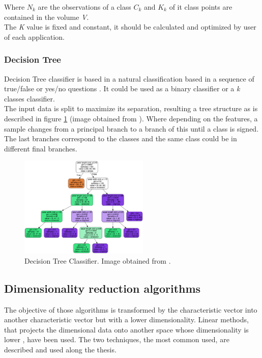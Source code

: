 Where $N_k$ are the observations of a class $C_k$ and $K_k$ of it class points are contained in the volume \textit{V}.\\

The \textit{K} value is fixed and constant, it should be calculated and optimized by user of each application.\\

\subsubsection{Decision Tree}
Decision Tree classifier is based in a natural classification based in a sequence of true/false or yes/no questions \cite{Duda}. It could be used as a binary classifier or a \textit{k} classes classifier. \\

The input data is split to maximize its separation, resulting a tree structure \cite{ClassifiersReview} as is described in figure \ref{fig:Tree} (image obtained from \cite{Treeimage}). Where depending on the features, a sample changes from a principal branch to a branch of this until a class is signed. The last branches correspond to the classes and the same class could be in different final branches. \\

\begin{figure}[htb]
\centering
\includegraphics[width=0.55\textwidth]{images_miscelaneus/tree.png}
\caption{Decision Tree Classifier. Image obtained from \cite{Treeimage}.} \label{fig:Tree}
\end{figure}

\subsection{Dimensionality reduction algorithms}
The objective of those algorithms is transformed by the characteristic vector into another characteristic vector but with a lower dimensionality. Linear methods, that projects the dimensional data onto another space whose dimensionality is lower \cite{Duda}, have been used. The two techniques, the most common used, are described and used along the thesis.\\

